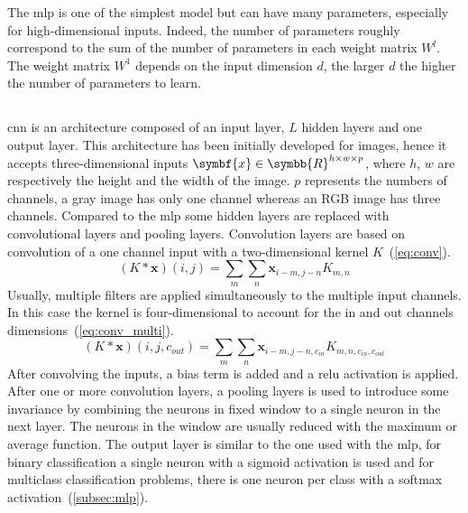 \documentclass[../main.tex]{subfiles}
\begin{document}
	 The \gls{mlp} is one of the simplest model but can have many parameters, especially for high-dimensional inputs.
	 Indeed, the number of parameters roughly correspond to the sum of the number of parameters in each weight matrix \(W^{l}\).
	 The weight matrix \(W^1\) depends on the input dimension \(d\), the larger \(d\) the higher the number of parameters to learn.

 \subsection{}
	 \Gls{cnn} is an architecture composed of an input layer, \(L\) hidden layers and one output layer.
	 This architecture has been initially developed for images, hence it accepts three-dimensional inputs \(\symbf{x} \in \symbb{R}^{h\times w \times p} \), where \(h\), \(w\) are respectively the height and the width of the image.
	 \(p\) represents the numbers of channels, a gray image has only one channel whereas an RGB image has three channels.
	 Compared to the \gls{mlp} some hidden layers are replaced with convolutional layers and pooling layers.
	 Convolution layers are based on convolution of a one channel input with a two-dimensional kernel \(K\)~(\cref{eq:conv}).
	 \begin{equation}
		 \left(K * \symbf{x}\right)\left(i,j\right) =\sum_m\sum_n \symbf{x}_{i-m, j-n}K_{m,n} \label{eq:conv}
	 \end{equation}
	 Usually, multiple filters are applied simultaneously to the multiple input channels.
	 In this case the kernel is four-dimensional to account for the in and out channels dimensions~(\cref{eq:conv_multi}).
	 \begin{equation}
		 \left(K * \symbf{x}\right)\left(i,j, c_{out}\right) =\sum_m\sum_n \symbf{x}_{i-m, j-n, c_{in}}K_{m,n, c_{in}, c_{out}} \label{eq:conv_multi}
	 \end{equation}
	 After convolving the inputs, a bias term is added and a \gls{relu} activation is applied.
	 After one or more convolution layers, a pooling layers is used to introduce some invariance by combining the neurons in fixed window to a single neuron in the next layer.
	 The neurons in the window are usually reduced with the maximum or average function.
	 The output layer is similar to the one used with the \gls{mlp}, for binary classification a single neuron with a sigmoid activation is used and for multiclass classification problems, there is one neuron per class with a softmax activation~(\cref{subsec:mlp}).
\end{document}
